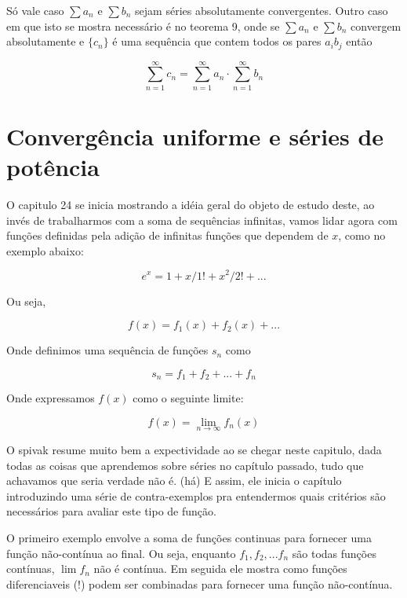 \documentclass[a4paper, 12pt]{article}
\begin{document}
Só vale caso $\sum a_n$ e $\sum b_n$ sejam séries absolutamente convergentes. Outro caso em que isto
se mostra necessário é no teorema 9, onde se $\sum a_n$ e $\sum b_n$ convergem absolutamente e $\{c_n\}$
é uma sequência que contem todos os pares $a_ib_j$ então

\begin{equation}
 \nonumber \sum_{n=1}^\infty c_n = \sum_{n=1}^\infty a_n \cdot \sum_{n=1}^\infty b_n  
\end{equation}

\newpage
\section{Convergência uniforme e séries de potência}

O capitulo 24 se inicia mostrando a idéia geral do objeto de estudo deste, ao invés de 
trabalharmos com a soma de sequências infinitas, vamos lidar agora com funções definidas
pela adição de infinitas funções que dependem de $x$, como no exemplo abaixo:

\begin{equation}
	\nonumber e^x = 1 + x/1! + x^2/2! + ...
\end{equation}

Ou seja,

\begin{equation}
	\nonumber f(x) = f_1(x) + f_2(x) + ...
\end{equation}

Onde definimos uma sequência de funções $s_n$ como

\begin{equation}
	\nonumber s_n = f_1 + f_2 + ... + f_n
\end{equation}

Onde expressamos $f(x)$ como o seguinte limite:

\begin{equation}
	\nonumber f(x) = \lim_{n \to \infty} f_n(x)
\end{equation}

O spivak resume muito bem a expectividade ao se chegar neste capitulo, dada todas as coisas
que aprendemos sobre séries no capítulo passado, tudo que achavamos que seria verdade não é. (há)
E assim, ele inicia o capítulo introduzindo uma série de contra-exemplos pra entendermos quais critérios
são necessários para avaliar este tipo de função.

O primeiro exemplo envolve a soma de funções continuas para fornecer uma função não-contínua 
ao final. Ou seja, enquanto $f_1, f_2, ... f_n$ são todas funções contínuas, $\lim f_n$ não é
contínua. Em seguida ele mostra como funções diferenciaveis (!) podem ser combinadas para fornecer
uma função não-contínua.
\end{document}
